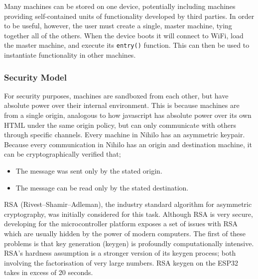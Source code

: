 \documentclass{article}
\begin{document}
Many machines can be stored on one device, potentially including machines providing self-contained units of functionality developed by third parties. In order to be useful, however, the user must create a single, master machine, tying together all of the others. When the device boots it will connect to WiFi, load the master machine, and execute its \texttt{entry()} function. This can then be used to instantiate functionality in other machines.

\subsubsection{Security Model}

For security purposes, machines are sandboxed from each other, but have absolute power over their internal environment. This is because machines are from a single origin, analogous to how javascript has absolute power over its own HTML under the same origin policy, but can only communicate with others through specific channels. Every machine in Nihilo has an asymmetric keypair. Because every communication in Nihilo has an origin and destination machine, it can be cryptographically verified that;
\begin{itemize}
\item The message was sent only by the stated origin.
\item The message can be read only by the stated destination.
\end{itemize}

RSA (Rivest–Shamir–Adleman)\cite{rsa}, the industry standard algorithm for asymmetric cryptography, was initially considered for this task. Although RSA is very secure, developing for the microcontroller platform exposes a set of issues with RSA which are usually hidden by the power of modern computers. The first of these problems is that key generation (keygen) is profoundly computationally intensive. RSA's hardness assumption is a stronger version of its keygen process; both involving the factorisation of very large numbers. RSA keygen on the ESP32 takes in excess of 20 seconds.
\end{document}
